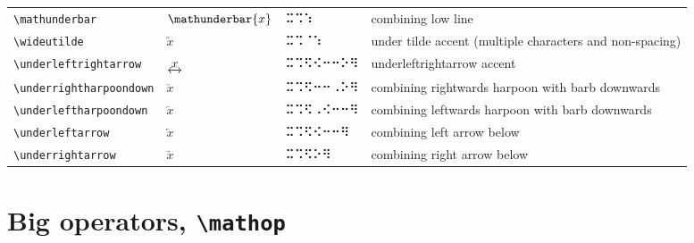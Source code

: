 \documentclass[oneside]{article}
\begin{document}
\begin{longtable}{llll}
\verb|\mathunderbar| & $\mathunderbar{x}$ &  ⠭⠩⠱  & {combining low line} \\[2ex]
\verb|\wideutilde| & $\wideutilde{x}$ &  ⠭⠩⠈⠱  & {under tilde accent (multiple characters and non-spacing)} \\[2ex]
\verb|\underleftrightarrow| & $\underleftrightarrow{x}$ &  ⠭⠩⠫⠪⠒⠒⠕⠻  & {underleftrightarrow accent} \\[2ex]
\verb|\underrightharpoondown| & $\underrightharpoondown{x}$ &  ⠭⠩⠫⠒⠒⠠⠕⠻  & {combining rightwards harpoon with barb downwards} \\[2ex]
\verb|\underleftharpoondown| & $\underleftharpoondown{x}$ &  ⠭⠩⠫⠠⠪⠒⠒⠻  & {combining leftwards harpoon with barb downwards} \\[2ex]
\verb|\underleftarrow| & $\underleftarrow{x}$ &  ⠭⠩⠫⠪⠒⠒⠻  & {combining left arrow below} \\[2ex]
\verb|\underrightarrow| & $\underrightarrow{x}$ &  ⠭⠩⠫⠕⠻  & {combining right arrow below} \\[2ex]
\end{longtable}



\clearpage

\section{Big operators, \texttt{\textbackslash{}mathop}}
\end{document}
